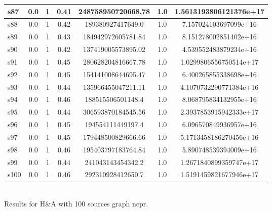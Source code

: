\documentclass{article}
\begin{document}
\begin{tabular}{|l|c|c|c|c|c|c|}
\hline
s87 &0.0 & 1 & 0.41 & 248758950720668.78 & 1.0 & 1.5613193806121376e+17\\
\hline
s88 &0.0 & 1 & 0.42 & 189380927417649.0 & 1.0 & 7.157024103697099e+16\\
\hline
s89 &0.0 & 1 & 0.43 & 184942972605781.84 & 1.0 & 8.151278002851402e+16\\
\hline
s90 &0.0 & 1 & 0.42 & 137419005573895.02 & 1.0 & 4.539552483879234e+16\\
\hline
s91 &0.0 & 1 & 0.45 & 280628204816667.78 & 1.0 & 1.0299806556750514e+17\\
\hline
s92 &0.0 & 1 & 0.45 & 154141008644695.47 & 1.0 & 6.400265855338698e+16\\
\hline
s93 &0.0 & 1 & 0.44 & 135966455047211.11 & 1.0 & 4.1070732290771384e+16\\
\hline
s94 &0.0 & 1 & 0.46 & 188515506501148.4 & 1.0 & 8.068795834132955e+16\\
\hline
s95 &0.0 & 1 & 0.44 & 306593870184545.56 & 1.0 & 2.3937853915942333e+17\\
\hline
s96 &0.0 & 1 & 0.45 & 194554111449197.4 & 1.0 & 6.096570849936957e+16\\
\hline
s97 &0.0 & 1 & 0.45 & 179448500829666.66 & 1.0 & 5.1713458186270456e+16\\
\hline
s98 &0.0 & 1 & 0.46 & 195403797183764.84 & 1.0 & 5.890748539394009e+16\\
\hline
s99 &0.0 & 1 & 0.44 & 241043143454342.2 & 1.0 & 1.2671840899359747e+17\\
\hline
s100 &0.0 & 1 & 0.46 & 292310928412650.7 & 1.0 & 1.5191459821677946e+17\\
\hline
\end{tabular}\\

\noindent Results for H\&A with 100 sources graph ncpr.
\end{document}
